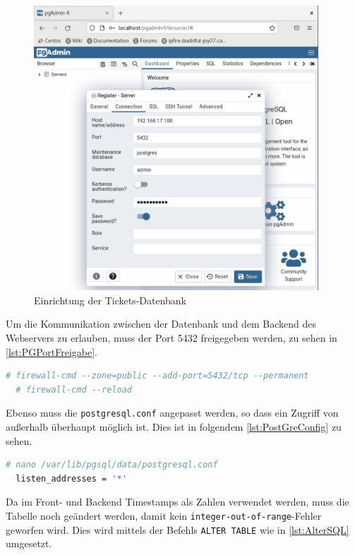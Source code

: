 \documentclass[a4paper,
    11pt,
    headings=small,
    ngerman,
    listof=totoc,
    numbers=noenddot]{scrreprt}[2021/11/13]
\begin{document}
\begin{figure}[htbp]
  \centering
  \includegraphics[width=0.95\textwidth]{data/PostGreSQL-Einrichtung.png}
  \caption{Einrichtung der Tickets-Datenbank}
  \label{fig:DBErstellung}
\end{figure}

Um die Kommunikation zwischen der Datenbank und dem Backend des Webservers zu erlauben, muss der Port 5432 freigegeben werden, zu sehen in \vref{lst:PGPortFreigabe}.

\begin{lstlisting}[language=bash,caption={Port-Freigabe einer CentOS-Firewall},label={lst:PGPortFreigabe}]
  # firewall-cmd --zone=public --add-port=5432/tcp --permanent
  # firewall-cmd --reload
\end{lstlisting}

Ebenso muss die \texttt{postgresql.conf} angepasst werden, so dass ein Zugriff von außerhalb überhaupt möglich ist. \autocite{vitux:PostgreSQL} Dies ist in folgendem \vref{lst:PostGreConfig} zu sehen.

\begin{lstlisting}[language=bash,caption={Einrichtung Zugriff PostGreSQL},label={lst:PostGreConfig}]
  # nano /var/lib/pgsql/data/postgresql.conf
  listen_addresses = '*'
\end{lstlisting}

Da im Front- und Backend Timestamps als Zahlen verwendet werden, muss die Tabelle noch geändert werden, damit kein \texttt{integer-out-of-range}-Fehler geworfen wird. Dies wird mittels der Befehls \texttt{ALTER TABLE} wie in \vref{lst:AlterSQL} umgesetzt.
\end{document}
